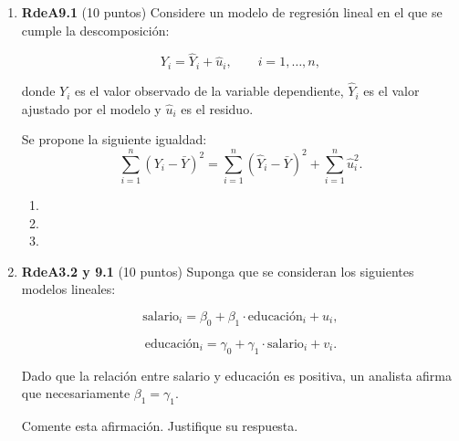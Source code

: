 \documentclass[10pt,a4paper]{article}
\begin{document}
\begin{enumerate}
    \item \textbf{RdeA9.1} (10 puntos) 
Considere un modelo de regresión lineal en el que se cumple la descomposición:

\[
Y_i = \hat{Y}_i + \hat{u}_i, \qquad i = 1,\dots,n,
\]

donde $Y_i$ es el valor observado de la variable dependiente, $\hat{Y}_i$ es el valor ajustado por el modelo y $\hat{u}_i$ es el residuo. 

Se propone la siguiente igualdad:
\[
\sum_{i=1}^n (Y_i - \bar{Y})^2 
= \sum_{i=1}^n (\hat{Y}_i - \bar{Y})^2 
+ \sum_{i=1}^n \hat{u}_i^2.
\]


\begin{enumerate}
    \item {}  

\item {} 



 \item    {} 

\end{enumerate}

     \item \textbf{RdeA3.2 y 9.1} (10 puntos) Suponga que se consideran los siguientes modelos lineales:

\[
\text{salario}_i = \beta_0 + \beta_1 \cdot \text{educación}_i + u_i,
\]

\[
\text{educación}_i = \gamma_0 + \gamma_1 \cdot \text{salario}_i + v_i.
\]

Dado que la relación entre salario y educación es positiva, un analista afirma que necesariamente 
$\beta_1 = \gamma_1$. 

Comente esta afirmación. Justifique su respuesta.

    
    

\end{enumerate}
\end{document}
